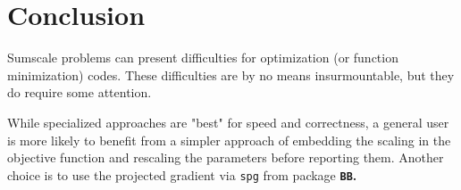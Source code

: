 \documentclass[11pt]{article}\usepackage[]{graphicx}\usepackage[]{color}
\newcommand{\code}[1]{{\tt#1}}
\newcommand{\pkg}[1]{\bf{\tt#1}\rm }
\begin{document}
\section{Conclusion}

Sumscale problems can present difficulties for optimization (or function minimization)
codes. These difficulties are by no means insurmountable, but they do require some 
attention.

While specialized approaches are "best" for speed and correctness, a general user is more
likely to benefit from a simpler approach of embedding the scaling in the objective function
and rescaling the parameters before reporting them. Another choice is to use the projected
gradient via \code{spg} from package \pkg{BB}.




\end{document}
